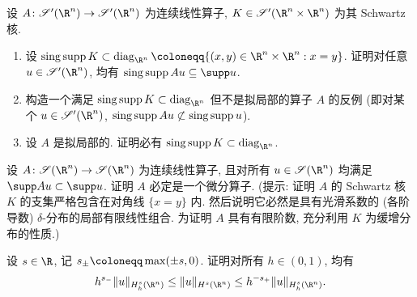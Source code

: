 \begin{exer}[奇异支集与算子拟局部性]\label{ex:2.21}
设 $A \colon \TempDistr(\R^n) \to \TempDistr(\R^n)$ 为连续线性算子, $K \in \TempDistr(\R^n \times \R^n)$ 为其 Schwartz 核.
\begin{enumerate}
    \item 设 $\singsupp K \subset \operatorname{diag}_{\R^n} \defeq \{(x, y) \in \R^n \times \R^n : x = y\}$. 证明对任意 $u \in \TempDistr(\R^n)$, 均有 $\singsupp A u \subseteq \supp u$.
    \item 构造一个满足 $\singsupp K \subset \operatorname{diag}_{\R^n}$ 但不是拟局部的算子 $A$ 的反例 (即对某个 $u \in \TempDistr(\R^n)$, $\operatorname{sing\,supp} A u \not\subset \operatorname{sing\,supp} u$).
    \item 设 $A$ 是拟局部的. 证明必有 $\singsupp K \subset \operatorname{diag}_{\R^n}$.
\end{enumerate}
\end{exer}

\begin{exer}[Peetre 定理]\label{ex:2.22}
设 $A \colon \Schwartz(\R^n) \to \Schwartz(\R^n)$ 为连续线性算子, 且对所有 $u \in \Schwartz(\R^n)$ 均满足 $\supp A u \subset \supp u$. 证明 $A$ 必定是一个微分算子. (提示: 证明 $A$ 的 Schwartz 核 $K$ 的支集严格包含在对角线 $\{x = y\}$ 内. 然后说明它必然是具有光滑系数的 (各阶导数) $\delta$-分布的局部有限线性组合. 为证明 $A$ 具有有限阶数, 充分利用 $K$ 为缓增分布的性质.)
\end{exer}

\begin{exer}\label{ex:2.23}
设 $s \in \R$, 记 $s_\pm \defeq \max(\pm s, 0)$. 证明对所有 $h \in (0, 1)$, 均有
\begin{equation}\label{eq:2.85}
    h^{s_-} \|u\|_{H_h^s(\R^n)} \le \|u\|_{H^s(\R^n)} \le h^{-s_+} \|u\|_{H_h^s(\R^n)}.
\end{equation}
\end{exer}
